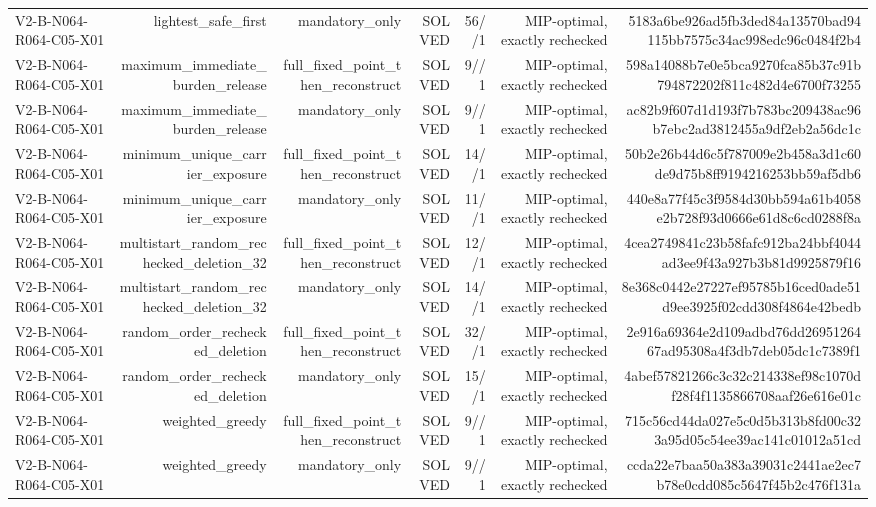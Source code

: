 {\begin{longtable}{lrrrrrr}
V2-B-N064-R064-C05-X01 & lightest\_safe\_first & mandatory\_only & SOLVED & 56//1 & MIP-optimal, exactly rechecked & 5183a6be926ad5fb3ded84a13570bad94115bb7575c34ac998edc96c0484f2b4 \\
V2-B-N064-R064-C05-X01 & maximum\_immediate\_burden\_release & full\_fixed\_point\_then\_reconstruct & SOLVED & 9//1 & MIP-optimal, exactly rechecked & 598a14088b7e0e5bca9270fca85b37c91b794872202f811c482d4e6700f73255 \\
V2-B-N064-R064-C05-X01 & maximum\_immediate\_burden\_release & mandatory\_only & SOLVED & 9//1 & MIP-optimal, exactly rechecked & ac82b9f607d1d193f7b783bc209438ac96b7ebc2ad3812455a9df2eb2a56dc1c \\
V2-B-N064-R064-C05-X01 & minimum\_unique\_carrier\_exposure & full\_fixed\_point\_then\_reconstruct & SOLVED & 14//1 & MIP-optimal, exactly rechecked & 50b2e26b44d6c5f787009e2b458a3d1c60de9d75b8ff9194216253bb59af5db6 \\
V2-B-N064-R064-C05-X01 & minimum\_unique\_carrier\_exposure & mandatory\_only & SOLVED & 11//1 & MIP-optimal, exactly rechecked & 440e8a77f45c3f9584d30bb594a61b4058e2b728f93d0666e61d8c6cd0288f8a \\
V2-B-N064-R064-C05-X01 & multistart\_random\_rechecked\_deletion\_32 & full\_fixed\_point\_then\_reconstruct & SOLVED & 12//1 & MIP-optimal, exactly rechecked & 4cea2749841c23b58fafc912ba24bbf4044ad3ee9f43a927b3b81d9925879f16 \\
V2-B-N064-R064-C05-X01 & multistart\_random\_rechecked\_deletion\_32 & mandatory\_only & SOLVED & 14//1 & MIP-optimal, exactly rechecked & 8e368c0442e27227ef95785b16ced0ade51d9ee3925f02cdd308f4864e42bedb \\
V2-B-N064-R064-C05-X01 & random\_order\_rechecked\_deletion & full\_fixed\_point\_then\_reconstruct & SOLVED & 32//1 & MIP-optimal, exactly rechecked & 2e916a69364e2d109adbd76dd2695126467ad95308a4f3db7deb05dc1c7389f1 \\
V2-B-N064-R064-C05-X01 & random\_order\_rechecked\_deletion & mandatory\_only & SOLVED & 15//1 & MIP-optimal, exactly rechecked & 4abef57821266c3c32c214338ef98c1070df28f4f1135866708aaf26e616e01c \\
V2-B-N064-R064-C05-X01 & weighted\_greedy & full\_fixed\_point\_then\_reconstruct & SOLVED & 9//1 & MIP-optimal, exactly rechecked & 715c56cd44da027e5c0d5b313b8fd00c323a95d05c54ee39ac141c01012a51cd \\
V2-B-N064-R064-C05-X01 & weighted\_greedy & mandatory\_only & SOLVED & 9//1 & MIP-optimal, exactly rechecked & ccda22e7baa50a383a39031c2441ae2ec7b78e0cdd085c5647f45b2c476f131a \\

\end{longtable}}
